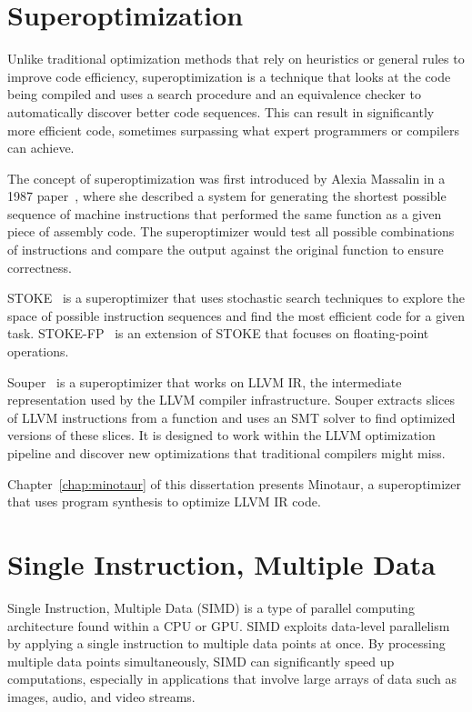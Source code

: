 \section{Superoptimization}
\label{sec:superoptimization}


Unlike traditional optimization methods that rely on heuristics or
general rules to improve code efficiency, superoptimization is a
technique that looks at the code being compiled and uses a search
procedure and an equivalence checker to automatically discover better
code sequences.
%
This can result in significantly more efficient code, sometimes
surpassing what expert programmers or compilers can achieve.

The concept of superoptimization was first introduced by Alexia
Massalin in a 1987 paper~\cite{massalin}, where she described a system
for generating the shortest possible sequence of machine instructions
that performed the same function as a given piece of assembly code.
The superoptimizer would test all possible combinations of
instructions and compare the output against the original function to
ensure correctness.

STOKE~\cite{stoke} is a superoptimizer that uses stochastic search
techniques to explore the space of possible instruction sequences and
find the most efficient code for a given task.
STOKE-FP~\cite{stoke-fp} is an extension of STOKE that focuses on
floating-point operations.

Souper~\cite{souper} is a superoptimizer that works on LLVM IR, the
intermediate representation used by the LLVM compiler infrastructure.
Souper extracts slices of LLVM instructions from a function and uses
an SMT solver to find optimized versions of these slices. It is
designed to work within the LLVM optimization pipeline and discover
new optimizations that traditional compilers might miss.

Chapter~\ref{chap:minotaur} of this dissertation presents Minotaur, a
superoptimizer that uses program synthesis to optimize LLVM IR code.

\section{Single Instruction, Multiple Data}
\label{sec:simd}

Single Instruction, Multiple Data (SIMD) is a type of parallel
computing architecture found within a CPU or GPU. SIMD exploits
data-level parallelism by applying a single instruction to multiple
data points at once.
%
By processing multiple data points simultaneously, SIMD can
significantly speed up computations, especially in applications that
involve large arrays of data such as images, audio, and video streams.

